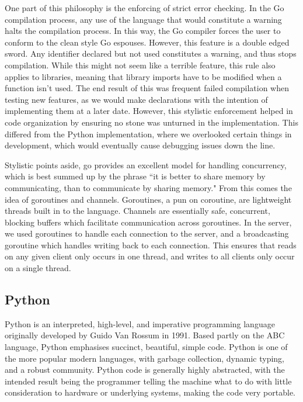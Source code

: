 \documentclass[12pt, letterpaper]{article}
\begin{document}
One part of this philosophy is the enforcing of strict error checking.
In the Go compilation process, any use of the language that would
constitute a warning halts the compilation process. In this way, the
Go compiler forces the user to conform to the clean style Go espouses.
However, this feature is a double edged sword. Any identifier declared
but not used constitutes a warning, and thus stops compilation. While
this might not seem like a terrible feature, this rule also applies to
libraries, meaning that library imports have to be modified when a
function isn't used. The end result of this was frequent failed
compilation when testing new features, as we would make declarations
with the intention of implementing them at a later date. However,
this stylistic enforcement helped in code organization by ensuring
no stone was unturned in the implementation. This differed from the
Python implementation, where we overlooked certain things in
development, which would eventually cause debugging issues down the
line. 

Stylistic points aside, go provides an excellent model for handling 
concurrency, which is best summed up by the phrase ``it is better to 
share memory by communicating, than to communicate by sharing memory." 
From this comes the idea of goroutines and channels. Goroutines, a pun 
on coroutine, are lightweight threads built in to the language. 
Channels are essentially safe, concurrent, blocking buffers which 
facilitate communication across goroutines. In the server, we used 
goroutines to handle each connection to the server, and a broadcasting
goroutine which handles writing back to each connection. This ensures
that reads on any given client only occurs in one thread, and writes to
all clients only occur on a single thread.


\subsection*{Python}


Python is an interpreted, high-level, and imperative programming language
originally developed by Guido Van Rossum in 1991. Based partly on the
ABC language, Python emphasises succinct, beautiful, simple code.
Python is one of the more popular modern languages, with garbage collection,
dynamic typing, and a robust community. Python code is generally highly
abstracted, with the intended result being the programmer telling the
machine what to do with little consideration to hardware or underlying
systems, making the code very portable.
\end{document}
